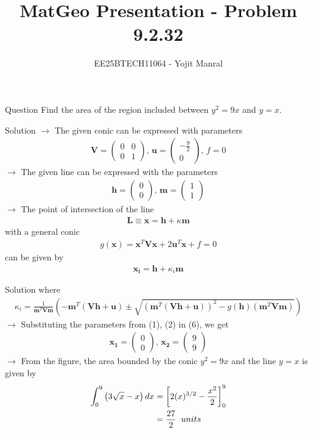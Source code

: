 \documentclass{beamer}
\title{MatGeo Presentation - Problem 9.2.32}
\author{EE25BTECH11064 - Yojit Manral}
\date{}
\numberwithin{equation}{section}
\providecommand{\brak}[1]{\ensuremath{\left(#1\right)}}
\theoremstyle{remark}
\newcommand{\myvec}[1]{\ensuremath{\begin{pmatrix}#1\end{pmatrix}}}
\let\vec\mathbf
\begin{document}
\frame{\titlepage}
\begin{frame}{Question}
Find the area of the region included between $y^2 = 9x$ and $y = x$.
\end{frame}

\begin{frame}{Solution}
$\rightarrow$ The given conic can be expressed with parameters
\begin{align}
    \vec{V} = \myvec{0&0\\0&1}\text{, } \vec{u} = \myvec{-\frac{9}{2}\\0}\text{, } f = 0
\end{align}
$\rightarrow$ The given line can be expressed with the parameters
\begin{align}
    \vec{h} = \myvec{0\\0}\text{, } \vec{m} = \myvec{1\\1}
\end{align}
$\rightarrow$ The point of intersection of the line
\begin{align}
    \vec{L} \equiv \vec{x} = \vec{h} + \kappa\vec{m}
\end{align}
\hspace{0.3cm} with a general conic
\begin{align}
    g\brak{\vec{x}} = \vec{x}^T\vec{V}\vec{x} + 2\vec{u}^T\vec{x} + f = 0
\end{align}
\hspace{0.3cm} can be given by
\begin{align}
    \vec{x_i} = \vec{h} + \kappa_i\vec{m}
\end{align}
\end{frame}

\begin{frame}{Solution}
\hspace{0.3cm} where
\begin{align}
    \kappa_i = \frac{1}{\vec{m}^T\vec{V}\vec{m}}\brak{-\vec{m}^T\brak{\vec{V}\vec{h}+\vec{u}}\pm \sqrt{\brak{\vec{m}^T\brak{\vec{V}\vec{h}+\vec{u}}}^2-g\brak{\vec{h}}\brak{\vec{m}^T\vec{V}\vec{m}}}}
\end{align}
$\rightarrow$ Substituting the parameters from (1), (2) in (6), we get
\begin{align}
    \vec{x_1} = \myvec{0\\0}\text{, } \vec{x_2} = \myvec{9\\9}
\end{align}
$\rightarrow$ From the figure, the area bounded by the conic $y^2 = 9x$ and the line $y = x$ is given by
\begin{align}
    \int_{0}^{9}\brak{3\sqrt{x} - x}dx &= \left[2(x)^{3/2} - \frac{x^2}{2}\right]_{0}^{9} \\
    &= \frac{27}{2}\hspace{0.2cm}units
\end{align}
\end{frame}
\end{document}
